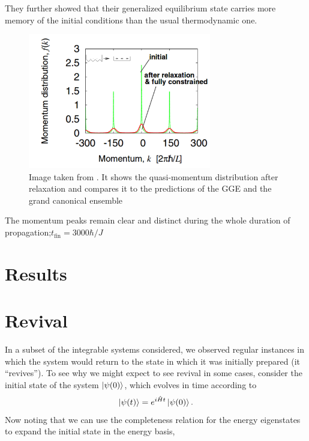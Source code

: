 \documentclass[a4paper,10pt]{article}
\begin{document}
{They further showed that their generalized equilibrium state carries more memory of the initial conditions than the usual thermodynamic one.

\begin{figure}[H]
 \includegraphics[width=8cm]{after_relaxation_rigol}
 \center
 \caption{Image taken from \cite{Rigol2007}. It shows the quasi-momentum distribution after relaxation and compares it to the predictions of the GGE and the grand canonical ensemble}
 \end{figure}

The momentum peaks remain clear and distinct during the whole duration  of  propagation;$t_{\text{fin}}=3000\hbar/J$





\section{Results}


\section{Revival}
In a subset of the integrable systems considered, we observed regular instances in which the system would return to the state in which it was initially prepared (it ``revives''). 
To see why we might expect to see revival in some cases, consider the initial state of the system $\ket{\psi(0)}$, which evolves in time according to
\begin{equation}
 \ket{\psi(t)}=e^{i\hat{H}t}\ket{\psi(0)}.
\end{equation}
Now noting that we can use the completeness relation for the energy eigenstates to expand the initial state in the energy basis,

}
\end{document}
